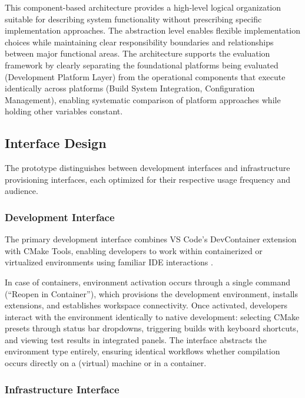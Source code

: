 This component-based architecture provides a high-level logical organization suitable for describing system functionality without prescribing specific implementation approaches.
The abstraction level enables flexible implementation choices while maintaining clear responsibility boundaries and relationships between major functional areas.
The architecture supports the evaluation framework by clearly separating the foundational platforms being evaluated (Development Platform Layer) from the operational components that execute identically across platforms (Build System Integration, Configuration Management), enabling systematic comparison of platform approaches while holding other variables constant.

\subsection{Interface Design}

The prototype distinguishes between development interfaces and infrastructure provisioning interfaces, each optimized for their respective usage frequency and audience.

\subsubsection{Development Interface}

The primary development interface combines VS Code's DevContainer extension with CMake Tools, enabling developers to work within containerized or virtualized environments using familiar IDE interactions \citep{microsoftDevelopingContainer2025, swidzinskiModernCMakeEffortlessly2024}.

In case of containers, environment activation occurs through a single command (``Reopen in Container''), which provisions the development environment, installs extensions, and establishes workspace connectivity.
Once activated, developers interact with the environment identically to native development: selecting CMake presets through status bar dropdowns, triggering builds with keyboard shortcuts, and viewing test results in integrated panels.
The interface abstracts the environment type entirely, ensuring identical workflows whether compilation occurs directly on a (virtual) machine or in a container.

\subsubsection{Infrastructure Interface}


